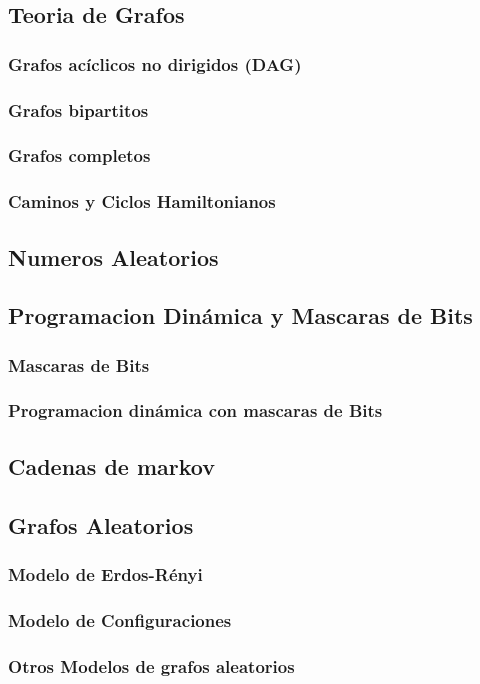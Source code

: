\subsection{Teoria de Grafos}
    \subsubsection{Grafos ac\'iclicos no dirigidos (DAG)}
    \subsubsection{Grafos bipartitos}
    \subsubsection{Grafos completos}
    \subsubsection{Caminos y Ciclos Hamiltonianos}
\subsection{Numeros Aleatorios}
\subsection{Programacion Din\'amica y Mascaras de Bits}
    \subsubsection{Mascaras de Bits}
    \subsubsection{Programacion din\'amica con mascaras de Bits}
\subsection{Cadenas de markov}
\subsection{Grafos Aleatorios}
    \subsubsection{Modelo de Erdos-R\'enyi}
    \subsubsection{Modelo de Configuraciones}
    \subsubsection{Otros Modelos de grafos aleatorios}